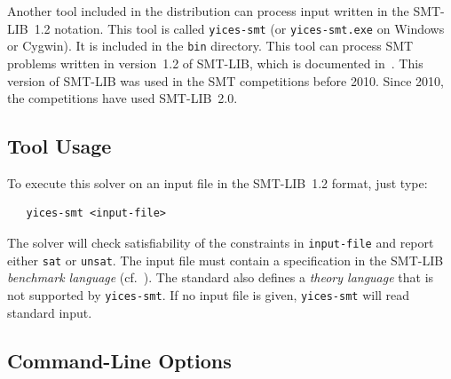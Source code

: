 \documentclass[11pt,twoside,fleqn,openright,titlepage]{cslreport}
\begin{document}
Another tool included in the distribution can process input written in
the SMT-LIB~1.2 notation. This tool is called \texttt{yices-smt} (or
\texttt{yices-smt.exe} on Windows or Cygwin). It is included in the
\texttt{bin} directory.  This tool can process SMT problems written in
version~1.2 of SMT-LIB, which is documented
in~\cite{SMTLIB12:2006}. This version of SMT-LIB was used in the SMT
competitions before 2010.  Since 2010, the competitions have used
SMT-LIB~2.0.

\subsection{Tool Usage}

To execute this solver on an input file in the SMT-LIB~1.2 format, just type:
\begin{small}
\begin{verbatim}
   yices-smt <input-file>
\end{verbatim}
\end{small}
The solver will check satisfiability of the constraints in
\texttt{input-file} and report either \texttt{sat} or
\texttt{unsat}. The input file must contain a specification in the
SMT-LIB {\em benchmark language\/} (cf.~\cite{SMTLIB12:2006}). The
standard also defines a {\em theory language\/} that is not supported
by \texttt{yices-smt}. If no input file is given, \texttt{yices-smt}
will read standard input.


\subsection{Command-Line Options}
\end{document}

